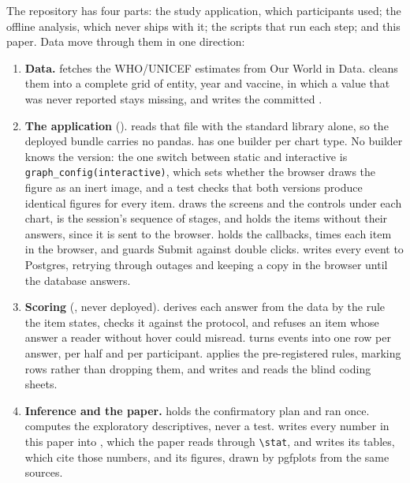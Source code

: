 \documentclass[10pt,twocolumn]{article}
\begin{document}
The repository has four parts: the study application, which participants used; the offline analysis, which never ships with it; the scripts that run each step; and this paper. Data move through them in one direction:

\begin{enumerate}
    \item \textbf{Data.}  fetches the WHO/UNICEF estimates from Our World in Data.  cleans them into a complete grid of entity, year and vaccine, in which a value that was never reported stays missing, and  writes the committed .
    \item \textbf{The application} ().  reads that file with the standard library alone, so the deployed bundle carries no pandas.  has one builder per chart type. No builder knows the version: the one switch between static and interactive is \texttt{graph\_config(interactive)}, which sets whether the browser draws the figure as an inert image, and a test checks that both versions produce identical figures for every item.  draws the screens and the controls under each chart,  is the session's sequence of stages, and  holds the items without their answers, since it is sent to the browser.  holds the callbacks, times each item in the browser, and guards Submit against double clicks.  writes every event to Postgres, retrying through outages and keeping a copy in the browser until the database answers.
    \item \textbf{Scoring} (, never deployed).  derives each answer from the data by the rule the item states, checks it against the protocol, and refuses an item whose answer a reader without hover could misread.  turns events into one row per answer, per half and per participant.  applies the pre-registered rules, marking rows rather than dropping them, and  writes and reads the blind coding sheets.
    \item \textbf{Inference and the paper.}  holds the confirmatory plan and ran once.  computes the exploratory descriptives, never a test.  writes every number in this paper into , which the paper reads through \texttt{\textbackslash stat}, and  writes its tables, which cite those numbers, and its figures, drawn by pgfplots from the same sources.
\end{enumerate}
\end{document}
